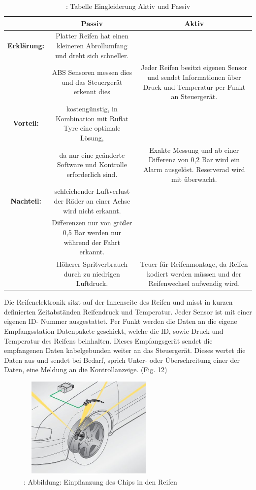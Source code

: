 				\begin{table}	
					\begin{tabular}{c|c|c}
						
						\textbf {  } & \textbf{Passiv} & \textbf {Aktiv}\\
						
						
						\hline
						\textbf{Erklärung:} & Platter Reifen hat einen kleineren Abrollumfang und dreht sich schneller.\\&ABS Sensoren messen dies und das Steuergerät erkennt dies & Jeder Reifen besitzt eigenen Sensor und sendet Informationen über Druck und Temperatur per Funkt an Steuergerät.\\
						
						
						\hline
						\textbf{Vorteil:} & kostengünstig, in Kombination mit Ruflat Tyre eine optimale Lösung, \\&da nur eine geänderte Software und Kontrolle erforderlich sind. & Exakte Messung und ab einer Differenz von 0,2 Bar wird ein Alarm ausgelöst. Reserverad wird mit überwacht.\\
						
	
						\hline
						\textbf{Nachteil:} & schleichender Luftverlust der Räder an einer Achse wird nicht erkannt.\\&Differenzen nur von größer 0,5 Bar werden nur während der Fahrt erkannt.\\&  Höherer Spritverbrauch durch zu niedrigen Luftdruck. & Teuer für Reifenmontage, da Reifen kodiert werden müssen und der Reifenwechsel aufwendig wird.\\
						\hline
					
					\end{tabular}
				\caption{ \cite{TS_rdks}: Tabelle Eingleiderung Aktiv und Passiv}
				\end{table}	
						
				Die Reifenelektronik sitzt auf der Innenseite des Reifen und misst in kurzen definierten Zeitabständen Reifendruck und Temperatur. Jeder Sensor ist mit einer eigenen ID- Nummer ausgestattet. Per Funkt werden die Daten an die eigene Empfangsstation Datenpakete geschickt, welche die ID, sowie Druck und Temperatur des Reifens beinhalten. Dieses Empfangsgerät sendet die empfangenen Daten kabelgebunden weiter an das Steuergerät. Dieses wertet die Daten aus und sendet bei Bedarf, sprich Unter- oder Überschreitung einer der Daten, eine Meldung an die Kontrollanzeige. (Fig. 12)
					
				\begin{figure}
					\centering
					\includegraphics[width=7cm, height=5cm] {rdks.png}
					\caption {\cite{TS_rdks_pic}: Abbildung: Einpflanzung des Chips in den Reifen}
				\end{figure}
				
